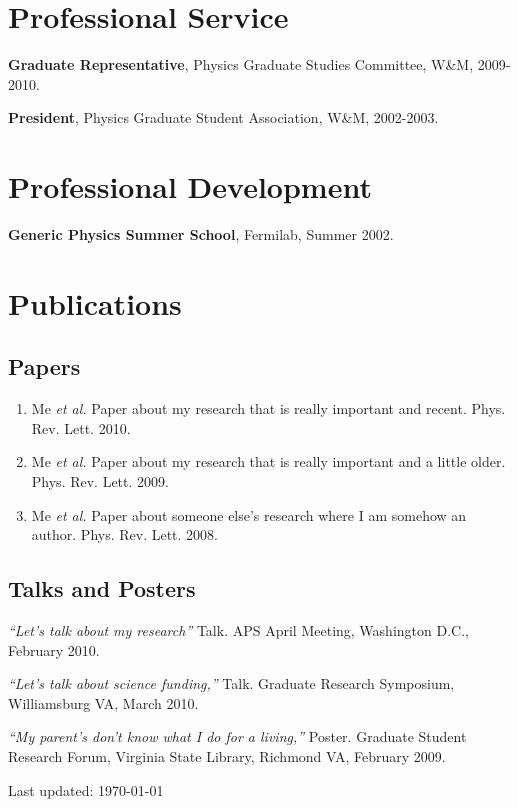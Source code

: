 \documentclass[letterpaper,10pt]{article}
\def\footerlink{}
\renewenvironment{itemize}{
  \begin{list}{}{
    \setlength{\leftmargin}{1.5em}
  }
}{
  \end{list}
}
\begin{document}
\section*{Professional Service}
\begin{itemize}
 \item \textbf{Graduate Representative}, Physics Graduate Studies Committee, W\&M, 2009-2010.
 \item \textbf{President}, Physics Graduate Student Association, W\&M, 2002-2003.
\end{itemize}

\section*{Professional Development}
\begin{itemize}
 \item \textbf{Generic Physics Summer School}, Fermilab, Summer 2002.
\end{itemize}


\section*{Publications}
\subsection*{Papers}
\begin{enumerate}
\item  Me \textit{et al.} Paper about my research that is really important and recent. Phys. Rev. Lett. 2010.
\item Me \textit{et al.} Paper about my research that is really important and a little older. Phys. Rev. Lett. 2009.
\item Me \textit{et al.} Paper about someone else's research where I am somehow an author. Phys. Rev. Lett. 2008.
\end{enumerate}
\subsection*{Talks and Posters}

\begin{itemize}
\item \textit{``Let's talk about my research''} Talk. APS April Meeting, Washington D.C., February 2010.
\item \textit{``Let's talk about science funding,''} Talk. Graduate Research Symposium, Williamsburg VA, March 2010.
\item \textit{``My parent's don't know what I do for a living,''} Poster. Graduate Student Research Forum, Virginia State Library, Richmond VA, February 2009.
\end{itemize}

\bigskip
\begin{center}
  \begin{footnotesize}
    Last updated: \today \\
    \href{\footerlink}{\texttt{\footerlink}}
  \end{footnotesize}
\end{center}
\end{document}
